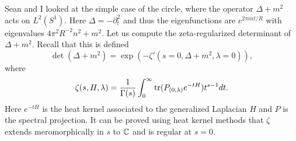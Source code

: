 \documentclass{amsart}
\begin{document}
Sean and I looked at the simple case of the circle, where the operator $\Delta+m^2$ acts on
$L^2(S^1)$. Here $\Delta=-\partial_t^2$ and thus the eigenfunctions are $e^{2\pi int/R}$
with eigenvalues $4\pi^2R^{-2}n^2+m^2$. Let us compute the zeta-regularized determinant of
$\Delta+m^2$. Recall that this is defined
\begin{equation*}
    \det(\Delta+m^2) = \exp(-\zeta'(s=0,\Delta+m^2,\lambda=0)),
\end{equation*}
where
\begin{equation*}
    \zeta(s,H,\lambda) = \frac{1}{\Gamma(s)}\int_0^\infty \operatorname{tr}(P_{(0,\lambda)}e^{-tH}) t^{s-1} dt.
\end{equation*}
Here $e^{-tH}$ is the heat kernel associated to the generalized Laplacian $H$
and $P$ is the spectral projection. It can be proved using heat kernel methods
that $\zeta$ extends meromorphically in $s$ to $\mathbb{C}$ and is regular at $s=0$.
\end{document}
